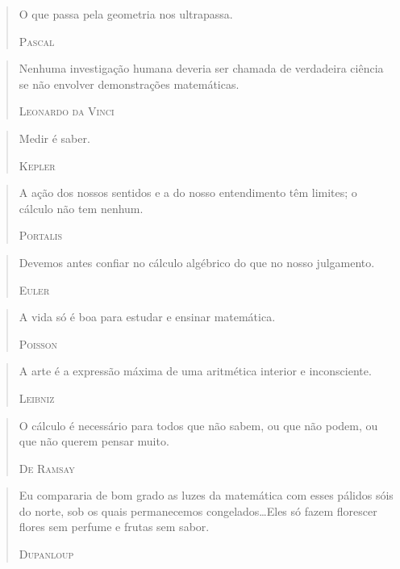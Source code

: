 \documentclass{hipatia}
\begin{document}
\begin{quote}
O que passa pela geometria nos ultrapassa.

\hfill \textsc{Pascal}
\end{quote}

 

\begin{quote}
    Nenhuma investigação humana deveria ser chamada de verdadeira ciência se não envolver demonstrações matemáticas.

\hfill \textsc{Leonardo da Vinci}
\end{quote}

 
\begin{quote}
Medir é saber.

\hfill \textsc{Kepler}
\end{quote}

 
\begin{quote}
A ação dos nossos sentidos e a do nosso entendimento têm limites; o cálculo não tem nenhum.

\hfill \textsc{Portalis}
\end{quote}
 
\begin{quote}
Devemos antes confiar no cálculo algébrico do que no nosso julgamento.

\hfill \textsc{Euler}
\end{quote}

 
\begin{quote}
A vida só é boa para estudar e ensinar matemática.

\hfill \textsc{Poisson}
\end{quote}

 
\begin{quote}
A arte é a expressão máxima de uma aritmética interior e inconsciente.

\hfill \textsc{Leibniz}
\end{quote}


\begin{quote}
O cálculo é necessário para todos que não sabem, ou que não podem, ou que não querem pensar muito.

\hfill \textsc{De Ramsay}
\end{quote}

 



\begin{quote}
Eu compararia de bom grado as luzes da matemática com esses pálidos sóis do norte, sob os quais permanecemos congelados\dots  Eles só fazem florescer flores sem perfume e frutas sem sabor.

\hfill \textsc{Dupanloup}
\end{quote}
\end{document}
